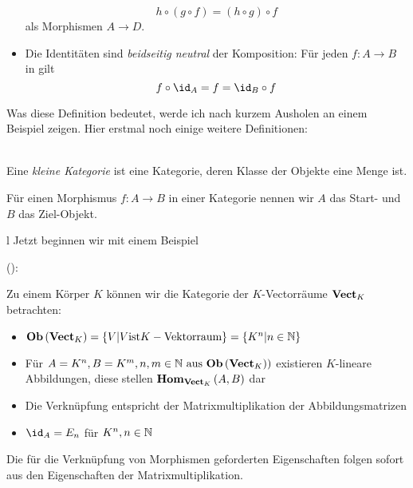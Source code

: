 \documentclass{article}
\begin{document}
\begin{defi}[Kategorie]
\begin{itemize}
			\begin{displaymath}
				h \circ \left( g \circ f \right) = \left( h \circ g \right) \circ f
			\end{displaymath}
			als Morphismen
			\begin{math}
				A \to D.
			\end{math}
			\item Die Identit\"aten sind \emph{beidseitig neutral} \bzgl der Komposition: F\"ur jeden \Mor 
			\begin{math}
				f: A \to B
			\end{math}
			in \CatC gilt
			\begin{displaymath}
				f \circ \id_A = f = \id_B \circ f
			\end{displaymath}
		\end{itemize}
		\end{defi}
		Was  diese Definition bedeutet, werde ich nach kurzem Ausholen an einem Beispiel zeigen.
		Hier erstmal noch einige weitere Definitionen:
		
		\begin{defi} \cite[Definition 2.2.29]{Bra} \\
		Eine \emph{kleine Kategorie} ist eine Kategorie, deren Klasse der Objekte eine Menge ist.
		\end{defi}
		\begin{defi}  \cite[Bemerkung 2.2.25]{Bra}
		F\"ur einen Morphismus \( f: A \to B \) in einer Kategorie \CatC nennen wir \( A \) das Start- und \( B \) das Ziel-Objekt.
		\end{defi}
		
l		Jetzt beginnen wir mit einem Beispiel

		\begin{bsp}
		
	(\cite[Beispiel 2.2.10]{Bra}):
		
		Zu einem K\"orper \( K \) k\"onnen wir die Kategorie der \( K\)-Vectorr\"aume \( \mathbf{Vect}_K \) betrachten:
		\begin{itemize}
			\item	\(  \mathbf{Ob}  \left( \mathbf{Vect}_K \right) = \left\lbrace V | V \text{ist} K-\text{Vektorraum} \right\rbrace  = \left\lbrace K^n | n \in \mathbb{N} \right\rbrace \)
			\item F\"ur  \( A=K^n , B =K^m , n,m \in \BN \ \text{aus} \ \Ob \left( \CatVect_K) \right) \) existieren $K$-lineare Abbildungen, diese stellen \(  \mathbf{Hom } _{\mathbf{Vect}_K}\left( A,B \right) \) dar
			\item Die Verkn\"upfung entspricht der Matrixmultiplikation der Abbildungsmatrizen 
			\item \( \id_A = E_n \) f\"ur \( K^n , n \in \mathbb{N} \)
		 \end{itemize}
		 Die f\"ur die Verkn\"upfung von Morphismen geforderten Eigenschaften folgen sofort aus den Eigenschaften der Matrixmultiplikation.
		 \end{bsp}
		 	 
\end{document}
